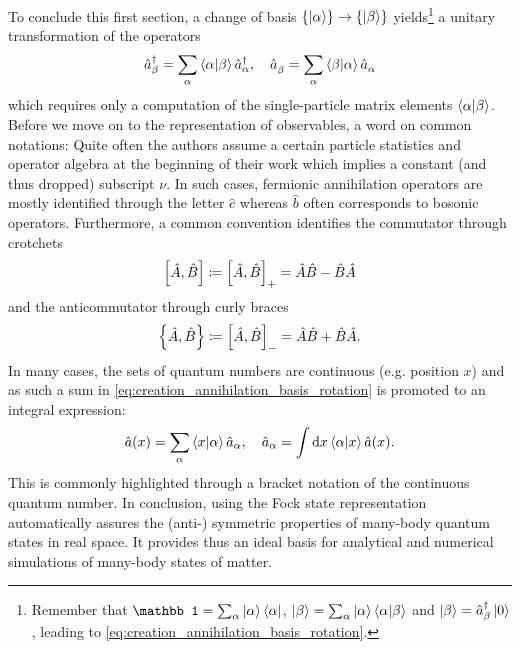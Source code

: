 To conclude this first section, a change of basis $\{\ket\alpha\}\rightarrow\{\ket\beta\}$ yields\footnote{Remember that $\mathbb1 = \sum_\alpha\ket{\alpha}\bra{\alpha}$, $\ket{\beta} = \sum_\alpha\ket{\alpha}\braket{\alpha|\beta}$ and $\ket{\beta}=\hat a^\dag_\beta\ket{0}$, leading to \cref{eq:creation_annihilation_basis_rotation}.} a unitary transformation of the operators
\begin{align}
    \hat a^\dag_\beta = \sum_\alpha \braket{\alpha|\beta}\hat a^\dag_\alpha,
    \quad
    \hat a^\pdag_\beta = \sum_\alpha \braket{\beta|\alpha}\hat a^\pdag_\alpha
    \label{eq:creation_annihilation_basis_rotation}
\end{align}
which requires only a computation of the single-particle matrix elements $\braket{\alpha|\beta}$.
Before we move on to the representation of observables, a word on common notations: Quite often the authors assume a certain particle statistics and operator algebra at the beginning of their work which implies a constant (and thus dropped) subscript $\nu$.
In such cases, fermionic annihilation operators are mostly identified through the letter $\hat c$ whereas $\hat b$ often corresponds to bosonic operators.
Furthermore, a common convention identifies the commutator through crotchets
\begin{align}
    \left[\hat A,\hat B\right]\coloneqq\left[ \hat A,\hat B \right]_+ = \hat A\hat B - \hat B\hat A
\end{align}
and the anticommutator through curly braces
\begin{align}
    \left\{ \hat A,\hat B \right\}\coloneqq\left[ \hat A,\hat B \right]_- = \hat A\hat B + \hat B\hat A.
\end{align}
In many cases, the sets of quantum numbers are continuous (e.g. position $x$) and as such a sum in \cref{eq:creation_annihilation_basis_rotation} is promoted to an integral expression:
\begin{align}
    \hat a(x) = \sum_\alpha \braket{x | \alpha} \hat a_\alpha,
    \quad
    \hat a_\alpha = \int{\mathrm dx} \braket{\alpha | x} \hat a(x).
\end{align}
This is commonly highlighted through a bracket notation of the continuous quantum number.
In conclusion, using the Fock state representation automatically assures the (anti-) symmetric properties of many-body quantum states in real space.
It provides thus an ideal basis for analytical and numerical simulations of many-body states of matter.
%
%
